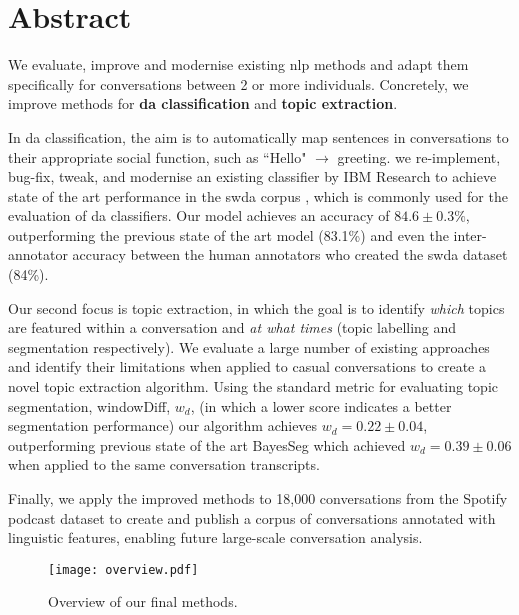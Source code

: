 \chapter*{Abstract}
\thispagestyle{empty}
We evaluate, improve and modernise existing \gls{nlp} methods and adapt them specifically for conversations between 2 or more individuals. Concretely, we improve methods for \textbf{\gls{da} classification} and \textbf{topic extraction}.

In \gls{da} classification, the aim is to automatically map sentences in conversations to their appropriate social function, such as ``Hello" $\rightarrow$ greeting. we re-implement, bug-fix, tweak, and modernise an existing classifier by IBM Research\cite{kumar2017dialogue} to achieve state of the art performance in the \gls{swda} corpus \cite{swda}, which is commonly used for the evaluation of \gls{da} classifiers.
Our \gls{model} achieves an accuracy of $\mathbf{84.6 \pm 0.3\%}$, outperforming the previous state of the art \gls{model} (83.1\%)\cite{ravi2018self} and even the inter-annotator accuracy between the human annotators who created the \gls{swda} dataset\cite{swda} (84\%).

Our second focus is topic extraction, in which the goal is to identify \textit{which} topics are featured within a conversation and \textit{at what times} (topic labelling and segmentation respectively). We evaluate a large number of existing approaches and identify their limitations when applied to casual conversations to create a novel topic extraction algorithm.
Using the standard metric for evaluating topic segmentation, windowDiff, $w_d$, (in which a lower score indicates a better segmentation performance) our algorithm achieves $w_d = \mathbf{0.22 \pm 0.04}$, outperforming previous state of the art BayesSeg\cite{eisenstein2008bayesian} which achieved $w_d = 0.39 \pm 0.06$ when applied to the same conversation transcripts.

Finally, we apply the improved methods to 18,000 conversations from the Spotify podcast dataset\cite{clifton-2020100000} to create and publish a corpus of conversations annotated with linguistic features, enabling future large-scale conversation analysis.

\begin{figure}
    \centering
    \texttt{[image: overview.pdf]}
    \caption{Overview of our final methods.}
    \label{fig:overview}
\end{figure}
\glsresetall
\newpage
